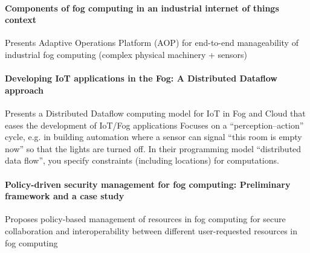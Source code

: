 \paragraph{Components of fog computing in an industrial internet of things context}\cite{gazis_components_2015}
Presents Adaptive Operations Platform (AOP) for end-to-end manageability of industrial fog computing (complex physical machinery + sensors)

\paragraph{Developing IoT applications in the Fog: A Distributed Dataflow approach} \cite{giang_developing_2015}
Presents a Distributed Dataflow computing model for IoT in Fog and Cloud that eases the development of IoT/Fog applications
Focuses on a ``perception--action'' cycle, e.g. in building automation where a sensor can signal ``this room is empty now'' so that the lights are turned off. In their programming model ``distributed data flow'', you specify constraints (including locations) for computations.

\paragraph{Policy-driven security management for fog computing: Preliminary framework and a case study} \cite{dsouza_policy-driven_2014}
Proposes policy-based management of resources in fog computing for secure collaboration and interoperability between different user-requested resources in fog computing
